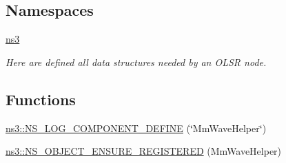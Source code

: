 \subsection*{Namespaces}
\begin{DoxyCompactItemize}
\item 
 \hyperlink{namespacens3}{ns3}
\begin{DoxyCompactList}\small\item\em Here are defined all data structures needed by an O\+L\+SR node. \end{DoxyCompactList}\end{DoxyCompactItemize}
\subsection*{Functions}
\begin{DoxyCompactItemize}
\item 
\hyperlink{namespacens3_a005826cabd8d0e4f5bc7dc2feb666cc6}{ns3\+::\+N\+S\+\_\+\+L\+O\+G\+\_\+\+C\+O\+M\+P\+O\+N\+E\+N\+T\+\_\+\+D\+E\+F\+I\+NE} (\char`\"{}Mm\+Wave\+Helper\char`\"{})
\item 
\hyperlink{namespacens3_a45874831aabd61db95e09562676298ae}{ns3\+::\+N\+S\+\_\+\+O\+B\+J\+E\+C\+T\+\_\+\+E\+N\+S\+U\+R\+E\+\_\+\+R\+E\+G\+I\+S\+T\+E\+R\+ED} (Mm\+Wave\+Helper)
\end{DoxyCompactItemize}
